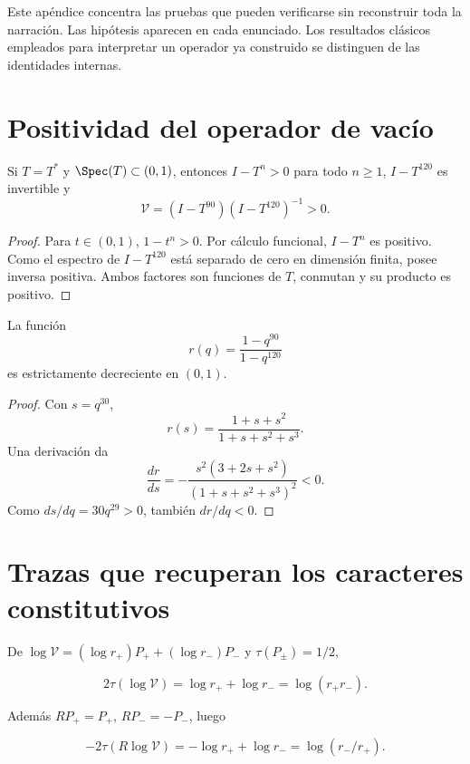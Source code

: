 \label{hmt:p3:app:proofs}

Este ap\'endice concentra las pruebas que pueden verificarse sin reconstruir toda la narraci\'on. Las hip\'otesis aparecen en cada enunciado. Los resultados cl\'asicos empleados para interpretar un operador ya construido se distinguen de las identidades internas.

\section{Positividad del operador de vac\'io}

\begin{lemma}
Si \(T=T^*\) y \(\Spec(T)\subset(0,1)\), entonces \(I-T^n>0\) para todo \(n\ge1\), \(I-T^{120}\) es invertible y
\[
\mathcal V=(I-T^{90})(I-T^{120})^{-1}>0.
\]
\end{lemma}

\begin{proof}
Para \(t\in(0,1)\), \(1-t^n>0\). Por c\'alculo funcional, \(I-T^n\) es positivo. Como el espectro de \(I-T^{120}\) est\'a separado de cero en dimensi\'on finita, posee inversa positiva. Ambos factores son funciones de \(T\), conmutan y su producto es positivo.
\end{proof}

\begin{lemma}
La funci\'on
\[
r(q)=\frac{1-q^{90}}{1-q^{120}}
\]
es estrictamente decreciente en \((0,1)\).
\end{lemma}

\begin{proof}
Con \(s=q^{30}\),
\[
r(s)=\frac{1+s+s^2}{1+s+s^2+s^3}.
\]
Una derivaci\'on da
\[
\frac{dr}{ds}=
-\frac{s^2(3+2s+s^2)}{(1+s+s^2+s^3)^2}<0.
\]
Como \(ds/dq=30q^{29}>0\), tambi\'en \(dr/dq<0\).
\end{proof}

\section{Trazas que recuperan los caracteres constitutivos}

De \(\log\mathcal V=(\log r_+)P_++(\log r_-)P_-\) y \(\tau(P_\pm)=1/2\),

\[
2\tau(\log\mathcal V)=\log r_++\log r_-=\log(r_+r_-).
\]

Adem\'as \(RP_+=P_+\), \(RP_-=-P_-\), luego

\[
-2\tau(R\log\mathcal V)
=-\log r_++\log r_-
=\log(r_-/r_+).
\]

